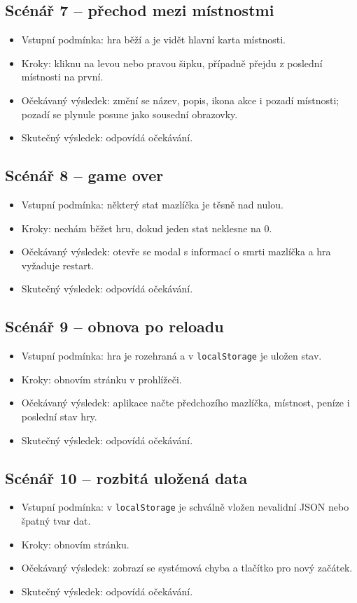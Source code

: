 \documentclass[12pt,a4paper]{article}
\begin{document}
\subsection*{Scénář 7 -- přechod mezi místnostmi}
\begin{itemize}[leftmargin=2em]
  \item Vstupní podmínka: hra běží a je vidět hlavní karta místnosti.
  \item Kroky: kliknu na levou nebo pravou šipku, případně přejdu z poslední místnosti na první.
  \item Očekávaný výsledek: změní se název, popis, ikona akce i pozadí místnosti; pozadí se plynule posune jako sousední obrazovky.
  \item Skutečný výsledek: odpovídá očekávání.
\end{itemize}

\subsection*{Scénář 8 -- game over}
\begin{itemize}[leftmargin=2em]
  \item Vstupní podmínka: některý stat mazlíčka je těsně nad nulou.
  \item Kroky: nechám běžet hru, dokud jeden stat neklesne na 0.
  \item Očekávaný výsledek: otevře se modal s informací o smrti mazlíčka a hra vyžaduje restart.
  \item Skutečný výsledek: odpovídá očekávání.
\end{itemize}

\subsection*{Scénář 9 -- obnova po reloadu}
\begin{itemize}[leftmargin=2em]
  \item Vstupní podmínka: hra je rozehraná a v \texttt{localStorage} je uložen stav.
  \item Kroky: obnovím stránku v prohlížeči.
  \item Očekávaný výsledek: aplikace načte předchozího mazlíčka, místnost, peníze i poslední stav hry.
  \item Skutečný výsledek: odpovídá očekávání.
\end{itemize}

\subsection*{Scénář 10 -- rozbitá uložená data}
\begin{itemize}[leftmargin=2em]
  \item Vstupní podmínka: v \texttt{localStorage} je schválně vložen nevalidní JSON nebo špatný tvar dat.
  \item Kroky: obnovím stránku.
  \item Očekávaný výsledek: zobrazí se systémová chyba a tlačítko pro nový začátek.
  \item Skutečný výsledek: odpovídá očekávání.
\end{itemize}
\end{document}
